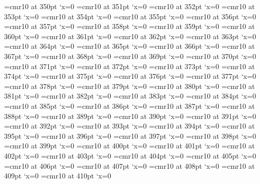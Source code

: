\font\FBSG=cmr10 at 350pt \lpcode\FBSG`x=0
\font\FBSH=cmr10 at 351pt \lpcode\FBSH`x=0
\font\FBSI=cmr10 at 352pt \lpcode\FBSI`x=0
\font\FBSJ=cmr10 at 353pt \lpcode\FBSJ`x=0
\font\FBSK=cmr10 at 354pt \lpcode\FBSK`x=0
\font\FBSL=cmr10 at 355pt \lpcode\FBSL`x=0
\font\FBSM=cmr10 at 356pt \lpcode\FBSM`x=0
\font\FBSN=cmr10 at 357pt \lpcode\FBSN`x=0
\font\FBSO=cmr10 at 358pt \lpcode\FBSO`x=0
\font\FBSP=cmr10 at 359pt \lpcode\FBSP`x=0
\font\FBSQ=cmr10 at 360pt \lpcode\FBSQ`x=0
\font\FBSR=cmr10 at 361pt \lpcode\FBSR`x=0
\font\FBSS=cmr10 at 362pt \lpcode\FBSS`x=0
\font\FBST=cmr10 at 363pt \lpcode\FBST`x=0
\font\FBSU=cmr10 at 364pt \lpcode\FBSU`x=0
\font\FBSV=cmr10 at 365pt \lpcode\FBSV`x=0
\font\FBSW=cmr10 at 366pt \lpcode\FBSW`x=0
\font\FBSX=cmr10 at 367pt \lpcode\FBSX`x=0
\font\FBSY=cmr10 at 368pt \lpcode\FBSY`x=0
\font\FBSZ=cmr10 at 369pt \lpcode\FBSZ`x=0
\font\FBTA=cmr10 at 370pt \lpcode\FBTA`x=0
\font\FBTB=cmr10 at 371pt \lpcode\FBTB`x=0
\font\FBTC=cmr10 at 372pt \lpcode\FBTC`x=0
\font\FBTD=cmr10 at 373pt \lpcode\FBTD`x=0
\font\FBTE=cmr10 at 374pt \lpcode\FBTE`x=0
\font\FBTF=cmr10 at 375pt \lpcode\FBTF`x=0
\font\FBTG=cmr10 at 376pt \lpcode\FBTG`x=0
\font\FBTH=cmr10 at 377pt \lpcode\FBTH`x=0
\font\FBTI=cmr10 at 378pt \lpcode\FBTI`x=0
\font\FBTJ=cmr10 at 379pt \lpcode\FBTJ`x=0
\font\FBTK=cmr10 at 380pt \lpcode\FBTK`x=0
\font\FBTL=cmr10 at 381pt \lpcode\FBTL`x=0
\font\FBTM=cmr10 at 382pt \lpcode\FBTM`x=0
\font\FBTN=cmr10 at 383pt \lpcode\FBTN`x=0
\font\FBTO=cmr10 at 384pt \lpcode\FBTO`x=0
\font\FBTP=cmr10 at 385pt \lpcode\FBTP`x=0
\font\FBTQ=cmr10 at 386pt \lpcode\FBTQ`x=0
\font\FBTR=cmr10 at 387pt \lpcode\FBTR`x=0
\font\FBTS=cmr10 at 388pt \lpcode\FBTS`x=0
\font\FBTT=cmr10 at 389pt \lpcode\FBTT`x=0
\font\FBTU=cmr10 at 390pt \lpcode\FBTU`x=0
\font\FBTV=cmr10 at 391pt \lpcode\FBTV`x=0
\font\FBTW=cmr10 at 392pt \lpcode\FBTW`x=0
\font\FBTX=cmr10 at 393pt \lpcode\FBTX`x=0
\font\FBTY=cmr10 at 394pt \lpcode\FBTY`x=0
\font\FBTZ=cmr10 at 395pt \lpcode\FBTZ`x=0
\font\FBUA=cmr10 at 396pt \lpcode\FBUA`x=0
\font\FBUB=cmr10 at 397pt \lpcode\FBUB`x=0
\font\FBUC=cmr10 at 398pt \lpcode\FBUC`x=0
\font\FBUD=cmr10 at 399pt \lpcode\FBUD`x=0
\font\FBUE=cmr10 at 400pt \lpcode\FBUE`x=0
\font\FBUF=cmr10 at 401pt \lpcode\FBUF`x=0
\font\FBUG=cmr10 at 402pt \lpcode\FBUG`x=0
\font\FBUH=cmr10 at 403pt \lpcode\FBUH`x=0
\font\FBUI=cmr10 at 404pt \lpcode\FBUI`x=0
\font\FBUJ=cmr10 at 405pt \lpcode\FBUJ`x=0
\font\FBUK=cmr10 at 406pt \lpcode\FBUK`x=0
\font\FBUL=cmr10 at 407pt \lpcode\FBUL`x=0
\font\FBUM=cmr10 at 408pt \lpcode\FBUM`x=0
\font\FBUN=cmr10 at 409pt \lpcode\FBUN`x=0
\font\FBUO=cmr10 at 410pt \lpcode\FBUO`x=0

